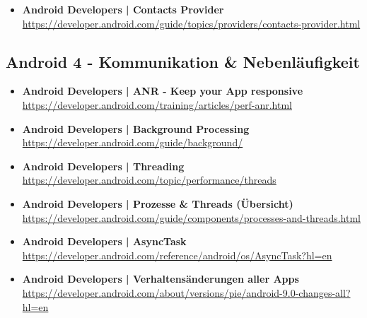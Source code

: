 \documentclass[a4paper]{article}
\begin{document}
{\begin{itemize}
		\item \textbf{Android Developers | Contacts Provider}\\
		\href{https://developer.android.com/guide/topics/providers/contacts-provider.html}
		{https://developer.android.com/guide/topics/providers/contacts-provider.html}
		
		
	\end{itemize}
	
	\subsection{Android 4 - Kommunikation \& Nebenläufigkeit}
	
	\begin{itemize}
		
		\item \textbf{Android Developers | ANR - Keep your App responsive}\\
		\href{https://developer.android.com/training/articles/perf-anr.html}
		{https://developer.android.com/training/articles/perf-anr.html}
		
		\item \textbf{Android Developers | Background Processing}\\
		\href{https://developer.android.com/guide/background/}
		{https://developer.android.com/guide/background/}
		
		\item \textbf{Android Developers | Threading}\\
		\href{https://developer.android.com/topic/performance/threads}
		{https://developer.android.com/topic/performance/threads}
		
		\item \textbf{Android Developers | Prozesse \& Threads (Übersicht)}\\
		\href{https://developer.android.com/guide/components/processes-and-threads.html}
		{https://developer.android.com/guide/components/processes-and-threads.html}
		
		\item \textbf{Android Developers | AsyncTask}\\
		\href{https://developer.android.com/reference/android/os/AsyncTask?hl=en}
		{https://developer.android.com/reference/android/os/AsyncTask?hl=en}
		
		\item \textbf{Android Developers | Verhaltensänderungen aller Apps}\\
		\href{https://developer.android.com/about/versions/pie/android-9.0-changes-all?hl=en}
		{https://developer.android.com/about/versions/pie/android-9.0-changes-all?hl=en}
		

\end{itemize}}
\end{document}
